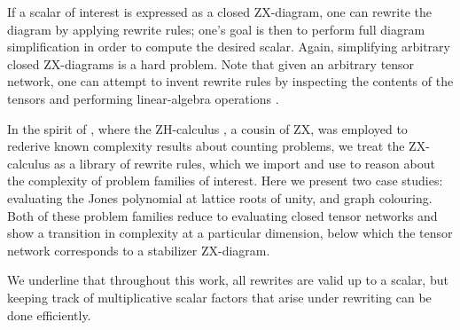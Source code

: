 If a scalar of interest is expressed as a closed ZX-diagram,
one can rewrite the diagram by applying rewrite rules; one's goal is then to perform full diagram simplification in order to compute the desired scalar.
Again, simplifying arbitrary closed ZX-diagrams is a hard problem.
Note that
given an arbitrary tensor network, one can attempt to invent rewrite rules by inspecting the contents of the tensors and performing linear-algebra operations \cite{gray2020hyperoptimized}.



In the spirit of \cite{debeaudrap2020tensor},
where the ZH-calculus \cite{backens2018zh}, a cousin of ZX, was employed to rederive known complexity results about counting problems, we treat the ZX-calculus as a library of rewrite rules, which we import and use to reason about the complexity of problem families of interest.
Here we present two case studies: evaluating the Jones polynomial at lattice roots of unity, and graph colouring.
Both of these problem families reduce to evaluating
closed tensor networks and show a transition in complexity
at a particular dimension, below which the tensor network corresponds to a stabilizer ZX-diagram.

We underline that throughout this work, all rewrites are valid
up to a scalar, but keeping track of multiplicative scalar factors that arise under rewriting can be done efficiently.
